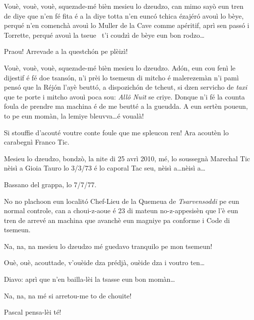 \begin{drama}
\Cienspeaks Vouè, vouè, vouè, squezade-mé bièn mesieu lo dzeu\-dzo, can mimo sayò eun tren de diye que n’en fé fita é a la diye totta n’en eunc\'o tchica ézajéró avouì lo bèye, perqué n’en comenchà avouì lo Muller de la Cave comme apéritif, aprì sen passó i Torrette, perqué avouì la tseue \carne\ t’i coudzì de bèye eun bon rodzo\ldots

\DzeudzoSenliquerspeaks Praou! Arrevade a la questchón pe plèizì!

\Cienspeaks Vouè, vouè, vouè, squezade-mé bièn mesieu lo dzeu\-dzo. Adón, eun cou fenì le dijestif é fé doe tsansón, n’i prèi lo tsemeun di mitcho é malerezemàn n’i pamì pensó que la Réjón l’ayè beuttó, a dispozichón de tcheut, si dzen servicho de \textit{taxi} que te porte i mitcho avouì poca sou: \textit{Allô Nuit} se criye. Donque n’i fé la counta foula de prendre ma machina é de me beutté a la gueudda. A eun sertèn poueun, to pe eun momàn, la lemiye bleuvva\ldots é voualà!

\DzeudzoSenliquerspeaks  Si stouffie d'acouté voutre conte foule que me spleucon ren! Ara acoutèn lo carabegnì Franco Tic.


\Ticspeaks Mesieu lo dzeudzo, bondzò, la nite di 25 avrì 2010, mé, lo soussegnà Marechal Tic nèisì a Gioia Tauro lo 3/3/73 é lo caporal Tac seu, nèisì a\ldots nèisì a\ldots

\Tacspeaks Bassano del grappa,  lo 7/7/77.

\Ticspeaks  No no plachoon eun localitó Chef-Lieu de la Quemeua de \textit{Tsarvensoddi} pe eun normal controle, can a choui-z-aoue é 23 di mateun no-z-appesisèn que l’è eun tren de arrevé an machina que avanchè eun magniye pa conforme i Code di tsemeun. 

\Cienspeaks Na, na, na mesieu lo dzeudzo mé guedavo tranquilo pe mon tsemeun!

\DzeudzoSenliquerspeaks {}  Ouè, ouè, acouttade, v'ou\-èi\-de dza prédjà, ouèide dza i  voutro ten\ldots

\Ticspeaks Diavo: aprì que n’en bailla-lèi la tsasse eun bon momàn\ldots

\Cienspeaks Na, na, na mé si arretou-me to de chouite!

\DzeudzoSenliquerspeaks {}  Pascal pensa-lèi té!



\end{drama}
